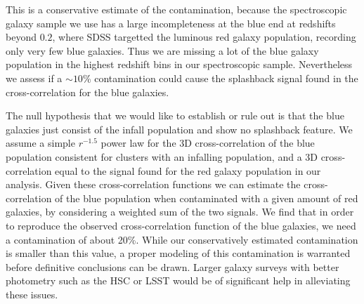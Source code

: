 \documentclass[iop, apjl, twocolappendix, numberedappendix]{emulateapj}
\begin{document}
This is a conservative estimate of the contamination, because the
spectroscopic galaxy sample we use has a large incompleteness at the
blue end at redshifts beyond $0.2$, where SDSS targetted the luminous
red galaxy population, recording only very few blue galaxies.
Thus we are missing a lot of the blue galaxy
population in the highest redshift bins in our spectroscopic sample.
Nevertheless we assess if a $\sim 10$\% contamination could
cause the splashback signal found in the cross-correlation for the blue galaxies.


The null hypothesis that we would like to establish or rule out is
that the blue galaxies just consist of the infall population and show
no splashback feature. We assume a simple $r^{-1.5}$ power law for the
3D cross-correlation of the blue population consistent for clusters with
an infalling population, and a 3D cross-correlation equal to the signal
found for the red galaxy population in our analysis. Given these
cross-correlation functions we can estimate the cross-correlation of
the blue population when contaminated with a given amount of red
galaxies, by considering a weighted sum of the two signals.
We find that in order to reproduce the observed
cross-correlation function of the blue galaxies, we need a contamination
of about 20\%. While our conservatively estimated contamination is
smaller than this value, a proper modeling of this contamination is
warranted before definitive conclusions can be drawn. Larger galaxy
surveys with better photometry such as the HSC or LSST would be of
significant help in alleviating these issues.
\end{document}
